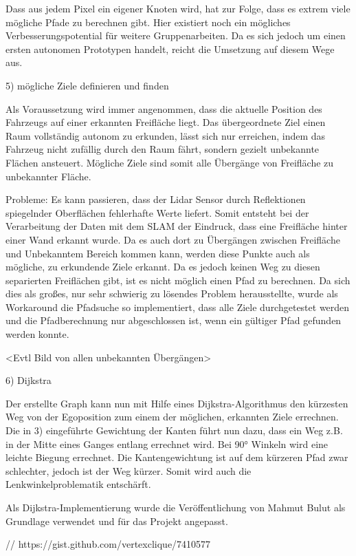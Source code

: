 Dass aus jedem Pixel ein eigener Knoten wird, hat zur Folge, dass es extrem viele mögliche Pfade zu berechnen gibt. Hier existiert noch ein mögliches Verbesserungspotential für weitere Gruppenarbeiten. Da es sich jedoch um einen ersten autonomen Prototypen handelt, reicht die Umsetzung auf diesem Wege aus.




5) mögliche Ziele definieren und finden

Als Voraussetzung wird immer angenommen, dass die aktuelle Position des Fahrzeugs auf einer erkannten Freifläche liegt. Das übergeordnete Ziel einen Raum vollständig autonom zu erkunden, lässt sich nur erreichen, indem das Fahrzeug nicht zufällig durch den Raum fährt, sondern gezielt unbekannte Flächen ansteuert. Mögliche Ziele sind somit alle Übergänge von Freifläche zu unbekannter Fläche. 

Probleme:
Es kann passieren, dass der Lidar Sensor durch Reflektionen spiegelnder Oberflächen fehlerhafte Werte liefert. Somit entsteht bei der Verarbeitung der Daten mit dem SLAM der Eindruck, dass eine Freifläche hinter einer Wand erkannt wurde. Da es auch dort zu Übergängen zwischen Freifläche und Unbekanntem Bereich kommen kann, werden diese Punkte auch als mögliche, zu erkundende Ziele erkannt. Da es jedoch keinen Weg zu diesen separierten Freiflächen gibt, ist es nicht möglich einen Pfad zu berechnen. Da sich dies als großes, nur sehr schwierig zu lösendes Problem herausstellte, wurde als Workaround die Pfadsuche so implementiert, dass alle Ziele durchgetestet werden und die Pfadberechnung nur abgeschlossen ist, wenn ein gültiger Pfad gefunden werden konnte.

<Evtl Bild von allen unbekannten Übergängen>


6) Dijkstra

Der erstellte Graph kann nun mit Hilfe eines Dijkstra-Algorithmus den kürzesten Weg von der Egoposition zum einem der möglichen, erkannten Ziele errechnen. Die in 3) eingeführte Gewichtung der Kanten führt nun dazu, dass ein Weg z.B. in der Mitte eines Ganges entlang errechnet wird. Bei 90° Winkeln wird eine leichte Biegung errechnet. Die Kantengewichtung ist auf dem kürzeren Pfad zwar schlechter, jedoch ist der Weg kürzer. Somit wird auch die Lenkwinkelproblematik entschärft. 

Als Dijkstra-Implementierung wurde die Veröffentlichung von Mahmut Bulut als Grundlage verwendet und für das Projekt angepasst.

// https://gist.github.com/vertexclique/7410577



